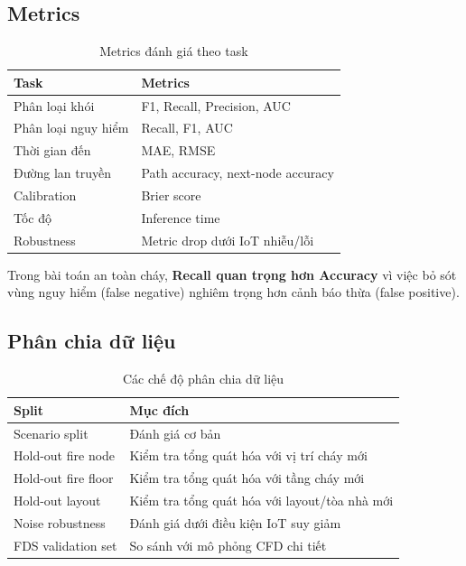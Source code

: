 \subsection{Metrics}

\begin{table}[H]
\centering
\caption{Metrics đánh giá theo task}
\label{tab:metrics}
\begin{tabularx}{\textwidth}{l X}
\toprule
\textbf{Task} & \textbf{Metrics} \\
\midrule
Phân loại khói     & F1, Recall, Precision, AUC \\
Phân loại nguy hiểm & Recall, F1, AUC \\
Thời gian đến       & MAE, RMSE \\
Đường lan truyền    & Path accuracy, next-node accuracy \\
Calibration         & Brier score \\
Tốc độ              & Inference time \\
Robustness          & Metric drop dưới IoT nhiễu/lỗi \\
\bottomrule
\end{tabularx}
\end{table}

\begin{notebox}
Trong bài toán an toàn cháy, \textbf{Recall quan trọng hơn Accuracy} vì việc bỏ sót vùng nguy hiểm (false negative) nghiêm trọng hơn cảnh báo thừa (false positive).
\end{notebox}

\subsection{Phân chia dữ liệu}

\begin{table}[H]
\centering
\caption{Các chế độ phân chia dữ liệu}
\label{tab:splits}
\begin{tabularx}{\textwidth}{l X}
\toprule
\textbf{Split} & \textbf{Mục đích} \\
\midrule
Scenario split        & Đánh giá cơ bản \\
Hold-out fire node    & Kiểm tra tổng quát hóa với vị trí cháy mới \\
Hold-out fire floor   & Kiểm tra tổng quát hóa với tầng cháy mới \\
Hold-out layout       & Kiểm tra tổng quát hóa với layout/tòa nhà mới \\
Noise robustness      & Đánh giá dưới điều kiện IoT suy giảm \\
FDS validation set    & So sánh với mô phỏng CFD chi tiết \\
\bottomrule
\end{tabularx}
\end{table}

